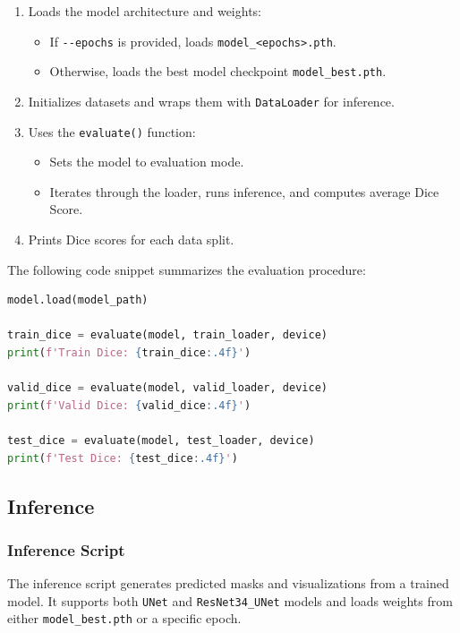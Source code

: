 \documentclass{homework}
\begin{document}
\begin{enumerate}
    \item Loads the model architecture and weights:
    \begin{itemize}
        \item If \lstinline{--epochs} is provided, loads \lstinline{model_<epochs>.pth}.
        \item Otherwise, loads the best model checkpoint \lstinline{model_best.pth}.
    \end{itemize}
    \item Initializes datasets and wraps them with \lstinline{DataLoader} for inference.
    \item Uses the \lstinline{evaluate()} function:
    \begin{itemize}
        \item Sets the model to evaluation mode.
        \item Iterates through the loader, runs inference, and computes average Dice Score.
    \end{itemize}
    \item Prints Dice scores for each data split.
\end{enumerate}

The following code snippet summarizes the evaluation procedure:

\begin{lstlisting}[language=Python]
model.load(model_path)

train_dice = evaluate(model, train_loader, device)
print(f'Train Dice: {train_dice:.4f}')

valid_dice = evaluate(model, valid_loader, device)
print(f'Valid Dice: {valid_dice:.4f}')

test_dice = evaluate(model, test_loader, device)
print(f'Test Dice: {test_dice:.4f}')
\end{lstlisting}

\subsection{Inference}

\subsubsection{Inference Script}

The inference script generates predicted masks and visualizations from a trained model. It supports both \lstinline{UNet} and \lstinline{ResNet34_UNet} models and loads weights from either \lstinline{model_best.pth} or a specific epoch.
\end{document}
